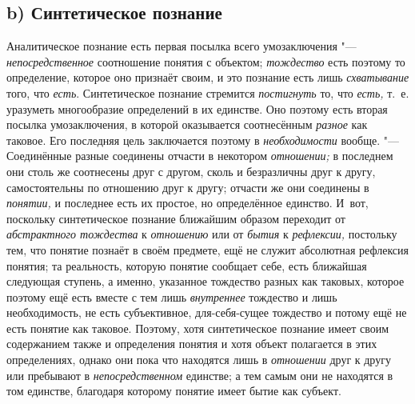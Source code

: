 \subsection[b) Синтетическое познание]{b) Синтетическое познание}

Аналитическое познание есть первая посылка всего
умозаключения "--- {\em непосредственное}
соотношение понятия с объектом;
{\em тождество} есть
поэтому то определение, которое оно признаёт своим, и это познание есть
лишь {\em схватывание}
того, что {\em есть}.
Синтетическое познание стремится
{\em постигнуть} то, что
{\em есть,} т.~е.
уразуметь многообразие определений в их единстве. Оно поэтому есть вторая
посылка умозаключения, в
которой
оказывается соотнесённым
{\em разное} как таковое.
Его последняя цель заключается поэтому в
{\em необходимости}
вообще. "--- Соединённые разные соединены отчасти
в некотором {\em отношении;}
в последнем они столь же соотнесены друг с другом, сколь и
безразличны друг к другу, самостоятельны по отношению друг к другу; отчасти
же они соединены в {\em понятии,}
и последнее есть их простое, но определённое единство. И~вот,
поскольку синтетическое познание ближайшим образом переходит от
{\em абстрактного тождества}
к {\em отношению}
или от {\em бытия}
к {\em рефлексии,}
постольку тем, что понятие познаёт в своём предмете, ещё не
служит абсолютная рефлексия понятия; та реальность, которую понятие
сообщает себе, есть ближайшая следующая ступень, а именно, указанное
тождество разных как таковых, которое поэтому ещё есть вместе с тем лишь
{\em внутреннее}
тождество и лишь необходимость, не есть субъективное,
для-себя-сущее тождество и потому ещё не есть понятие как таковое. Поэтому,
хотя синтетическое познание имеет своим содержанием также и определения
понятия и хотя объект полагается в этих определениях, однако они пока что
находятся лишь в {\em отношении}
друг к другу или пребывают в
{\em непосредственном}
единстве; а тем самым они не находятся в том единстве,
благодаря которому понятие имеет бытие как субъект.

